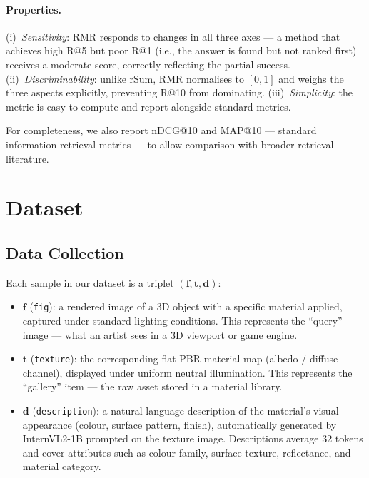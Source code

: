 \documentclass[10pt,twocolumn]{article}
\begin{document}
\paragraph{Properties.}
(i)~\emph{Sensitivity}: RMR responds to changes in all three axes — a method
that achieves high R@5 but poor R@1 (i.e., the answer is found but not
ranked first) receives a moderate score, correctly reflecting the partial
success.
(ii)~\emph{Discriminability}: unlike rSum, RMR normalises to $[0,1]$ and
weighs the three aspects explicitly, preventing R@10 from dominating.
(iii)~\emph{Simplicity}: the metric is easy to compute and report alongside
standard metrics.

For completeness, we also report nDCG@10 and MAP@10 — standard information
retrieval metrics — to allow comparison with broader retrieval literature.

\section{Dataset}

\subsection{Data Collection}

Each sample in our dataset is a triplet $(\mathbf{f}, \mathbf{t}, \mathbf{d})$:
\begin{itemize}[leftmargin=*,itemsep=0pt]
  \item $\mathbf{f}$ (\texttt{fig}): a rendered image of a 3D object with a
        specific material applied, captured under standard lighting conditions.
        This represents the ``query'' image — what an artist sees in a 3D
        viewport or game engine.
  \item $\mathbf{t}$ (\texttt{texture}): the corresponding flat PBR material
        map (albedo / diffuse channel), displayed under uniform neutral
        illumination.
        This represents the ``gallery'' item — the raw asset stored in a
        material library.
  \item $\mathbf{d}$ (\texttt{description}): a natural-language description
        of the material's visual appearance (colour, surface pattern, finish),
        automatically generated by InternVL2-1B prompted on the texture image.
        Descriptions average 32 tokens and cover attributes such as
        colour family, surface texture, reflectance, and material category.
\end{itemize}
\end{document}
